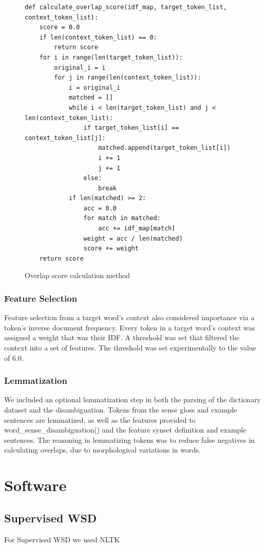 \documentclass[11pt]{article}
\begin{document}
\begin{figure}[ht]
\begin{lstlisting}
def calculate_overlap_score(idf_map, target_token_list, context_token_list):
    score = 0.0
    if len(context_token_list) == 0:
        return score
    for i in range(len(target_token_list)):
        original_i = i
        for j in range(len(context_token_list)):
            i = original_i
            matched = []
            while i < len(target_token_list) and j < len(context_token_list):
                if target_token_list[i] == context_token_list[j]:
                    matched.append(target_token_list[i])
                    i += 1
                    j += 1
                else:
                    break
            if len(matched) >= 2:
                acc = 0.0
                for match in matched:
                    acc += idf_map[match]
                weight = acc / len(matched)
                score += weight
    return score
\end{lstlisting}
\caption{Overlap score calculation method}
\label{overlap}
\end{figure}

\subsubsection{Feature Selection}
Feature selection from a target word's context also considered importance via a token's inverse document frequency. Every token in a target word's context was assigned a weight that was their IDF. A threshold was set that filtered the context into a set of features. The threshold was set experimentally to the value of $6.0$.

\subsubsection{Lemmatization}
We included an optional lemmatization step in both the parsing of the dictionary dataset and the disambiguation. Tokens from the sense gloss and example sentences are lemmatized, as well as the features provided to word\_sense\_disambiguation() and the feature synset definition and example sentences. The reasoning in lemmatizing tokens was to reduce false negatives in calculating overlaps, due to morphological variations in words.

\section{Software}
\subsection{Supervised WSD}
For Supervised WSD we used NLTK 
\end{document}
